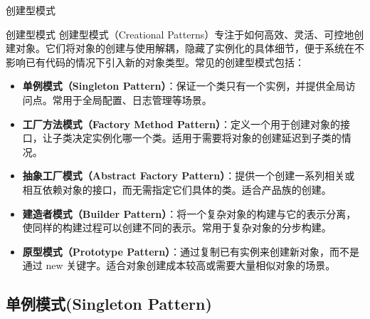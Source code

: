 \documentclass[UTF8,aspectratio=169]{beamer}
\begin{document}
\begin{frame}{创建型模式}
    \begin{ytublock}{创建型模式}
        创建型模式（Creational Patterns）专注于如何高效、灵活、可控地创建对象。它们将对象的创建与使用解耦，隐藏了实例化的具体细节，便于系统在不影响已有代码的情况下引入新的对象类型。常见的创建型模式包括：
        \begin{itemize}
            \item \textbf{单例模式（Singleton Pattern）}：保证一个类只有一个实例，并提供全局访问点。常用于全局配置、日志管理等场景。
            \item \textbf{工厂方法模式（Factory Method Pattern）}：定义一个用于创建对象的接口，让子类决定实例化哪一个类。适用于需要将对象的创建延迟到子类的情况。
            \item \textbf{抽象工厂模式（Abstract Factory Pattern）}：提供一个创建一系列相关或相互依赖对象的接口，而无需指定它们具体的类。适合产品族的创建。
            \item \textbf{建造者模式（Builder Pattern）}：将一个复杂对象的构建与它的表示分离，使同样的构建过程可以创建不同的表示。常用于复杂对象的分步构建。
            \item \textbf{原型模式（Prototype Pattern）}：通过复制已有实例来创建新对象，而不是通过 new 关键字。适合对象创建成本较高或需要大量相似对象的场景。
        \end{itemize}
    \end{ytublock}
\end{frame}

\subsection{单例模式(Singleton Pattern)}
\end{document}
